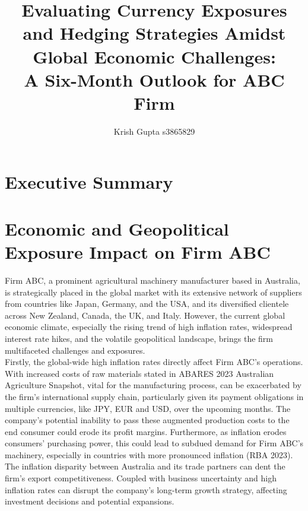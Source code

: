 \documentclass{article}
\title{Evaluating Currency Exposures and Hedging Strategies Amidst Global Economic Challenges:\\
A Six-Month Outlook for ABC Firm}
\author{Krish Gupta s3865829}
\begin{document}
\maketitle

\tableofcontents
\pagebreak

\section*{Executive Summary}

\section*{Economic and Geopolitical Exposure Impact on Firm ABC}
Firm ABC, a prominent agricultural machinery manufacturer based in Australia, is strategically placed in the global market with its extensive network of suppliers from countries like Japan, Germany, and the USA, and its diversified clientele across New Zealand, Canada, the UK, and Italy. However, the current global economic climate, especially the rising trend of high inflation rates, widespread interest rate hikes, and the volatile geopolitical landscape, brings the firm multifaceted challenges and exposures.\\

\noindent Firstly, the global-wide high inflation rates directly affect Firm ABC's operations. With increased costs of raw materials stated in ABARES 2023 Australian Agriculture Snapshot, vital for the manufacturing process, can be exacerbated by the firm's international supply chain, particularly given its payment obligations in multiple currencies, like JPY, EUR and USD, over the upcoming months. The company's potential inability to pass these augmented production costs to the end consumer could erode its profit margins. Furthermore, as inflation erodes consumers' purchasing power, this could lead to subdued demand for Firm ABC's machinery, especially in countries with more pronounced inflation (RBA 2023). The inflation disparity between Australia and its trade partners can dent the firm's export competitiveness. Coupled with business uncertainty and high inflation rates can disrupt the company's long-term growth strategy, affecting investment decisions and potential expansions.\\
\end{document}
